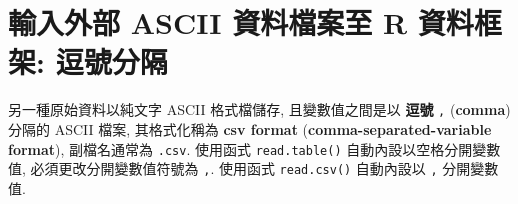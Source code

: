 \documentclass[
]{book}
\begin{document}
\hypertarget{ux8f38ux5165ux5916ux90e8-ascii-ux8cc7ux6599ux6a94ux6848ux81f3-r-ux8cc7ux6599ux6846ux67b6-ux9017ux865fux5206ux9694}{%
\section{輸入外部 ASCII 資料檔案至 R 資料框架: 逗號分隔}\label{ux8f38ux5165ux5916ux90e8-ascii-ux8cc7ux6599ux6a94ux6848ux81f3-r-ux8cc7ux6599ux6846ux67b6-ux9017ux865fux5206ux9694}}

另一種原始資料以純文字 ASCII 格式檔儲存,
且變數值之間是以 \textbf{逗號} \texttt{,} (\textbf{comma}) 分隔的 ASCII 檔案,
其格式化稱為
\textbf{csv format}
(\textbf{comma-separated-variable format}),
副檔名通常為 \texttt{.csv}.
使用函式
\texttt{read.table()}
自動內設以空格分開變數值,
必須更改分開變數值符號為 \texttt{,}.
使用函式 \texttt{read.csv()}
自動內設以 \texttt{,} 分開變數值.
\end{document}
